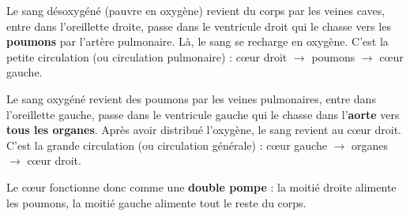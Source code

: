 \documentclass[11pt]{article}
\newcommand{\cle}[1]{{\popxbold\color{popdark}#1}}
\begin{document}
Le sang désoxygéné (pauvre en oxygène) revient du corps par les veines caves, entre dans l'oreillette droite, passe dans le ventricule droit qui le chasse vers les \textbf{poumons} par l'artère pulmonaire. Là, le sang se recharge en oxygène. C'est la \cle{petite circulation} (ou circulation pulmonaire) : cœur droit $\rightarrow$ poumons $\rightarrow$ cœur gauche.

Le sang oxygéné revient des poumons par les veines pulmonaires, entre dans l'oreillette gauche, passe dans le ventricule gauche qui le chasse dans l'\textbf{aorte} vers \textbf{tous les organes}. Après avoir distribué l'oxygène, le sang revient au cœur droit. C'est la \cle{grande circulation} (ou circulation générale) : cœur gauche $\rightarrow$ organes $\rightarrow$ cœur droit.

Le cœur fonctionne donc comme une \textbf{double pompe} : la moitié droite alimente les poumons, la moitié gauche alimente tout le reste du corps.
\end{document}
